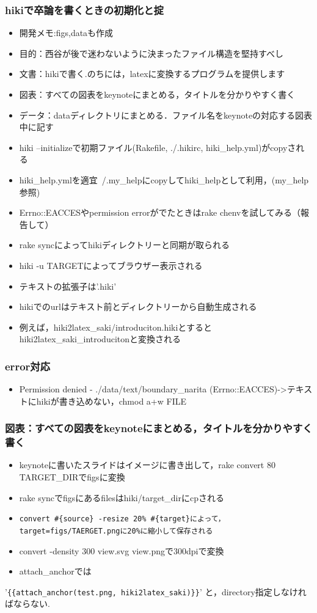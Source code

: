 \subsubsection{hikiで卒論を書くときの初期化と掟}
\begin{itemize}
\item 開発メモ:figs,dataも作成
\item 目的：西谷が後で迷わないように決まったファイル構造を堅持すべし
\item 文書：hikiで書く.のちには，latexに変換するプログラムを提供します
\item 図表：すべての図表をkeynoteにまとめる，タイトルを分かりやすく書く
\item データ：dataディレクトリにまとめる．ファイル名をkeynoteの対応する図表中に記す
\item hiki --initializeで初期ファイル(Rakefile, ./.hikirc, hiki\_help.yml)がcopyされる
\item hiki\_help.ymlを適宜~/.my\_helpにcopyしてhiki\_helpとして利用，(my\_help参照)
\item Errno::EACCESやpermission errorがでたときはrake chenvを試してみる（報告して）
\item rake syncによってhikiディレクトリーと同期が取られる
\item hiki -u TARGETによってブラウザー表示される
\item テキストの拡張子は'.hiki'
\item hikiでのurlはテキスト前とディレクトリーから自動生成される
\item 例えば，hiki2latex\_saki/introduciton.hikiとするとhiki2latex\_saki\_introducitonと変換される
\end{itemize}
\subsubsection{error対応}
\begin{itemize}
\item Permission denied - ./data/text/boundary\_narita (Errno::EACCES)->テキストにhikiが書き込めない，chmod a+w FILE
\end{itemize}
\subsubsection{図表：すべての図表をkeynoteにまとめる，タイトルを分かりやすく書く}
\begin{itemize}
\item keynoteに書いたスライドはイメージに書き出して，rake convert 80 TARGET\_DIRでfigsに変換
\item rake syncでfigsにあるfilesはhiki/target\_dirにcpされる
\item \verb|convert #{source} -resize 20% #{target}によって，target=figs/TAERGET.pngに20%に縮小して保存される|
\item convert -density 300 view.svg view.pngで300dpiで変換
\item attach\_anchorでは
\end{itemize}
'\verb|{{attach_anchor(test.png, hiki2latex_saki)}}|'
と，directory指定しなければならない.

